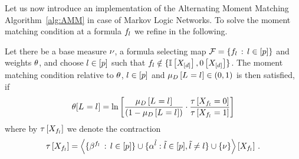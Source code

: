 \label{sec:alternatingParEstMLN}

Let us now introduce an implementation of the Alternating Moment Matching Algorithm~\ref{alg:AMM} in case of Markov Logic Networks.
To solve the moment matching condition at a formula $f_{l}$ we refine  in the following.

\begin{lemma}
    \label{ref:lemMMinMLN}
    Let there be a base measure $\nu$, a formula selecting map $\mathcal{F}=\{f_{l} \, : \, l\in[p]\}$ and weights $\theta$, and choose $l\in[p]$ such that $f_{l}  \notin \{\mathbb{I}\left[X_{[d]}\right],0\left[X_{[d]}\right]\}$.
    The moment matching condition relative to $\theta$, $l\in[p]$ and $\mu_{D}\left[L_{}=l_{}\right]\in(0,1)$ is then satisfied, if
    \begin{align}
        \label{sol:momentMatchingExformula}
        \theta[L_{}=l_{}] = \ln \left[ 
            \frac{\mu_{D}\left[L_{}=l_{}\right]}{(1-\mu_{D}\left[L_{}=l_{}\right])}
            \cdot \frac{\tau\left[X_{f_{l} }=0\right]}{\tau\left[X_{f_{l} }=1\right]}
         \right]
    \end{align}
    where by $\tau\left[X_{f_{l} }\right]$ we denote the contraction
    \begin{align*}
        \tau\left[X_{f_{l}}\right]
        = \left\langle \{\beta^{f_{l}} \, : \, l\in[p]\}
        \cup\{\alpha^{\tilde{l}} : \tilde{l} \in [p], \tilde{l}\neq l\}
        \cup\{\nu\}\right\rangle \left[ X_{f_{l}} \right] \, .
    \end{align*}
\end{lemma}
